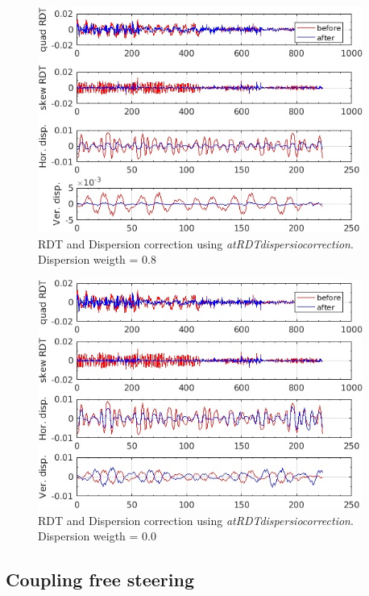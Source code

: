 \begin{figure}[!h]
	\centering
	\includegraphics[width=0.95\textwidth]{./images/corrections/RDT/RDTdispCor0p80_0p10_0p80_.jpg}
	\caption{RDT and Dispersion correction using \emph{atRDTdispersiocorrection}. Dispersion weigth = 0.8 }
	\label{fig:RDTcor0p8}
\end{figure}

\begin{figure}[!h]
	\centering
	\includegraphics[width=0.95\textwidth]{./images/corrections/RDT/RDTdispCor0p00_0p00_0p00_.jpg}
	\caption{RDT and Dispersion correction using \emph{atRDTdispersiocorrection}. Dispersion weigth = 0.0 }
	\label{fig:RDTcor0}
\end{figure}

\subsection{Coupling free steering}
